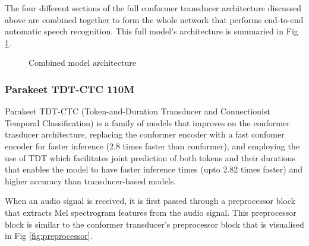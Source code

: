 \documentclass{CSSRforAfrica}
\newcounter{subsubsubsection}[subsubsection]
\begin{document}
The four different sections of the full conformer transducer architecture discussed above are combined together to form the whole network that performs end-to-end automatic speech recognition. This full model's architecture is summaried in Fig \ref{fig:combined}.

\begin{figure}[thb]
\begin{center}
\end{center}
\caption{Combined model architecture}
\label{fig:combined}
\end{figure}

\subsubsection{Parakeet TDT-CTC 110M}
Parakeet TDT-CTC (Token-and-Duration Transducer and Connectionist Temporal Classification) is a family of models that improves on the conformer trasducer architecture, replacing the conformer encoder with a fast confomer encoder \cite{rekesh2023fastconformerlinearlyscalable} for faster inference (2.8 times faster than conformer), and employing the use of TDT \cite{xu2023efficientsequencetransductionjointly} which facilitates joint prediction of both tokens and their durations that enables the model to have faster inference times (upto 2.82 times faster) and higher accuracy than transducer-based models.

When an audio signal is received, it is first passed through a preprocessor block that extracts Mel spectrogram features from the audio signal. This preprocessor block is similar to the conformer transducer's preprocessor block that is visualised in Fig \ref{fig:preprocessor}.
\end{document}
